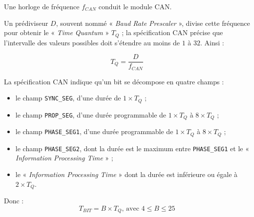 


\thispagestyle{empty}


Une horloge de fréquence $f_{CAN}$ conduit le module CAN.

Un prédiviseur $D$, souvent nommé « \emph{Baud Rate Prescaler} », divise cette fréquence pour obtenir le « \emph{Time Quantum} » $T_Q$ ; la spécification CAN précise que l'intervalle des valeurs possibles doit s'étendre au moins de $1$ à $32$. Ainsi :

\begin{equation*}
  T_Q = \frac{D}{f_{CAN}}
\end{equation*}

La spécification CAN\cite{canSpecifBosch} indique qu'un bit se décompose en quatre champs :
\begin{itemize}
  \item le champ \texttt{SYNC\_SEG}, d'une durée de $1\times T_Q$ ;
  \item le champ \texttt{PROP\_SEG}, d'une durée programmable de $1\times T_Q$ à $8\times T_Q$ ;
  \item le champ \texttt{PHASE\_SEG1}, d'une durée programmable de $1\times T_Q$ à $8\times T_Q$ ;
  \item le champ \texttt{PHASE\_SEG2}, dont la durée est le maximum entre \texttt{PHASE\_SEG1} et le « \emph{Information Processing Time} » ;
  \item le « \emph{Information Processing Time} » dont la durée est inférieure ou égale à $2\times T_Q$.
\end{itemize}

Donc :
\begin{equation*}
  T_{BIT} = B \times T_Q\text{, avec~} 4 \leqslant B \leqslant 25
\end{equation*}




